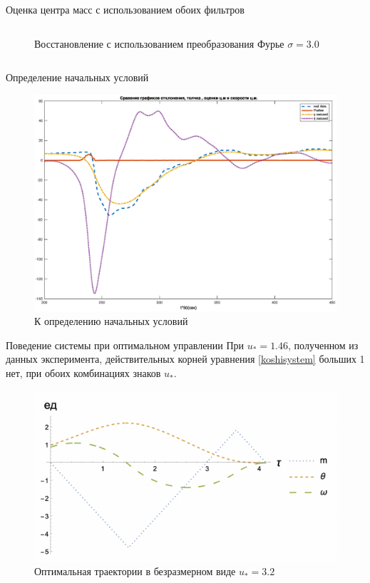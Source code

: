 \documentclass[10pt]{beamer}
\begin{document}
\begin{frame}{Оценка центра масс с использованием обоих фильтров}
\begin{columns}
\begin{figure}[h!]
			\caption{Восстановление с использованием преобразования Фурье $\sigma=3.0$}
			\label{restore_fur_real}
		\end{figure}
	\end{columns}
\end{frame}
\begin{frame}{Определение начальных условий}
	\begin{figure}[h!]
		\centering
		\includegraphics[width=0.9\linewidth]{bold_combo.eps}
		\caption{К определению начальных условий}
		\label{restore_double_real}
	\end{figure}
\end{frame}

\begin{frame}{Поведение системы при оптимальном управлении}
	При $u_\ast=1.46$, полученном из данных эксперимента, действительных корней уравнения \eqref{koshisystem} больших 1 нет,
	при обоих комбинациях знаков $u_\ast$.
	\begin{figure}[h!]
		\centering
		\includegraphics[width=0.7\linewidth]{3_graphs.png}
		\caption{Оптимальная траектории в безразмерном виде $u_\ast=3.2$ }
		\label{3_graphs}
	\end{figure}
\end{frame}
\end{document}
